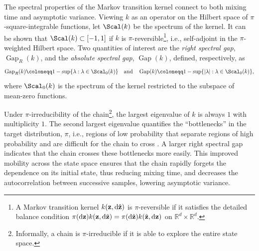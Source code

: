 \documentclass[onefignum,onetabnum]{siamonline250211}
\renewcommand{\d} {{\rm d}}                                %
\newcommand{\bfz}{{\bf z}}
\begin{document}
The spectral properties of the Markov transition kernel connect to both mixing time and asymptotic variance.
Viewing $k$ as an operator on the Hilbert space of $\pi$-square-integrable functions, let $\Scal(k)$ be the spectrum of the kernel.
It can be shown that $\Scal(k) \subset [-1,1]$ if $k$ is $\pi$-reversible\footnote{A Markov transition kernel $k(\bfz,\d\hat\bfz)$ is $\pi$-reversible if it satisfies the detailed balance condition $\pi(\d\bfz)k(\bfz,\d\hat\bfz)=\pi(\d\hat\bfz)k(\hat \bfz,\d\bfz)$ on $\mathbb{R}^d\times \mathbb{R}^d$.}, i.e., self-adjoint in the $\pi$-weighted Hilbert space.
Two quantities of interest are the \emph{right spectral gap}, $\operatorname{Gap}_R(k)$, and the \emph{absolute spectral gap}, $\operatorname{Gap}(k)$, defined, respectively, as
    \begin{align}\label{eq:spectral_gap}
        \operatorname{Gap}_R(k)
        \coloneqq 1 - \sup \{\lambda : \lambda \in \Scal_0(k)\}\quad \text{and} \quad
        \operatorname{Gap}(k) \coloneqq 1 - \sup \{|\lambda| : \lambda \in \Scal_0(k)\},
    \end{align}
where $\Scal_0(k)$ is the spectrum of the kernel restricted to the subspace of mean-zero functions.

%
%
%
%
%
%

Under $\pi$-irreducibility of the chain\footnote{Informally, a chain is $\pi$-irreducible if it is able to explore the entire state space.},  the largest eigenvalue of $k$ is always $1$ with multiplicity $1$.
%
The second largest eigenvalue quantifies the ``bottlenecks'' in the target distribution, $\pi$, i.e., regions of low probability that separate regions of high probability and are difficult for the chain to cross \cite{lawler_bounds_1988,qin_convergence_2024, milinanni_large_2025}.
A larger right spectral gap indicates that the chain crosses these bottlenecks more easily. This improved mobility across the state space ensures that the chain rapidly forgets the dependence on its initial state, thus reducing mixing time, and decreases the autocorrelation between successive samples, lowering asymptotic variance.
\end{document}
